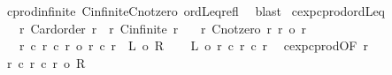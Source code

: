 \begin{isabellebody}
%
\isadelimproof
%
\endisadelimproof
%
\isatagproof
{}\isamarkupfalse%
\ cprod{\isacharunderscore}{\kern0pt}infinite{}{\isacharprime}{\kern0pt}\ Cinfinite{\isacharunderscore}{\kern0pt}Cnotzero\ ordLeq{\isacharunderscore}{\kern0pt}refl\ \isamarkupfalse%
\ blast%
\endisatagproof
{\isafoldproof}%
%
\isadelimproof
\isanewline
%
\endisadelimproof
\isanewline
{}\isamarkupfalse%
\ cexp{\isacharunderscore}{\kern0pt}cprod{\isacharunderscore}{\kern0pt}ordLeq{\isacharcolon}{\kern0pt}\isanewline
\ \ \ r{}{\isacharcolon}{\kern0pt}\ {\isachardoublequoteopen}Card{\isacharunderscore}{\kern0pt}order\ r{}{\isachardoublequoteclose}\ \ r{}{\isacharcolon}{\kern0pt}\ {\isachardoublequoteopen}Cinfinite\ r{}{\isachardoublequoteclose}\isanewline
\ \ \ r{}{\isacharcolon}{\kern0pt}\ {\isachardoublequoteopen}Cnotzero\ r{}{\isachardoublequoteclose}\ {\isachardoublequoteopen}r{}\ {\isasymle}o\ r{}{\isachardoublequoteclose}\isanewline
\ \ \ {\isachardoublequoteopen}{\isacharparenleft}{\kern0pt}r{}\ {\isacharcircum}{\kern0pt}c\ r{}{\isacharparenright}{\kern0pt}\ {\isacharcircum}{\kern0pt}c\ r{}\ {\isacharequal}{\kern0pt}o\ r{}\ {\isacharcircum}{\kern0pt}c\ r{}{\isachardoublequoteclose}\ {\isacharparenleft}{\kern0pt}\ {\isachardoublequoteopen}{\isacharquery}{\kern0pt}L\ {\isacharequal}{\kern0pt}o\ {\isacharquery}{\kern0pt}R{\isachardoublequoteclose}{\isacharparenright}{\kern0pt}\isanewline
%
\isadelimproof
%
\endisadelimproof
%
\isatagproof
{}\isamarkupfalse%
{\isacharminus}{\kern0pt}\isanewline
\ \ \isamarkupfalse%
\ {\isachardoublequoteopen}{\isacharquery}{\kern0pt}L\ {\isacharequal}{\kern0pt}o\ r{}\ {\isacharcircum}{\kern0pt}c\ {\isacharparenleft}{\kern0pt}r{}\ {\isacharasterisk}{\kern0pt}c\ r{}{\isacharparenright}{\kern0pt}{\isachardoublequoteclose}\ \isamarkupfalse%
\ cexp{\isacharunderscore}{\kern0pt}cprod{\isacharbrackleft}{\kern0pt}OF\ r{}{\isacharbrackright}{\kern0pt}\ \isacommand{{\isachardot}{\kern0pt}}\isamarkupfalse%
\isanewline
\ \ \isamarkupfalse%
\ \isamarkupfalse%
\ {\isachardoublequoteopen}r{}\ {\isacharcircum}{\kern0pt}c\ {\isacharparenleft}{\kern0pt}r{}\ {\isacharasterisk}{\kern0pt}c\ r{}{\isacharparenright}{\kern0pt}\ {\isacharequal}{\kern0pt}o\ {\isacharquery}{\kern0pt}R{\isachardoublequoteclose}\isanewline

\end{isabellebody}
